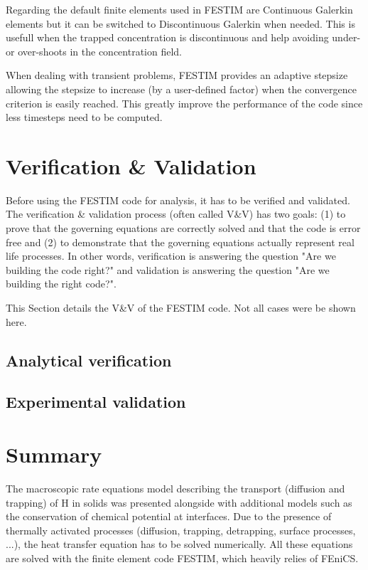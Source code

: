 Regarding the default finite elements used in FESTIM are Continuous Galerkin elements but it can be switched to Discontinuous Galerkin when needed.
This is usefull when the trapped concentration is discontinuous and help avoiding under- or over-shoots in the concentration field.

When dealing with transient problems, FESTIM provides an adaptive stepsize allowing the stepsize to increase (by a user-defined factor) when the convergence criterion is easily reached.
This greatly improve the performance of the code since less timesteps need to be computed.



\section{Verification \& Validation}

Before using the FESTIM code for analysis, it has to be verified and validated.
The verification \& validation process (often called V\&V) has two goals: (1) to prove that the governing equations are correctly solved and that the code is error free and (2) to demonstrate that the governing equations actually represent real life processes.
In other words, verification is answering the question "Are we building the code right?" and validation is answering the question "Are we building the right code?".

This Section details the V\&V of the FESTIM code.
Not all cases were be shown here.

\subsection{Analytical verification}



\subsection{Experimental validation}



\section{Summary}

The macroscopic rate equations model describing the transport (diffusion and trapping) of H in solids was presented alongside with additional models such as the conservation of chemical potential at interfaces.
Due to the presence of thermally activated processes (diffusion, trapping, detrapping, surface processes, ...), the heat transfer equation has to be solved numerically.
All these equations are solved with the finite element code FESTIM, which heavily relies of FEniCS.

